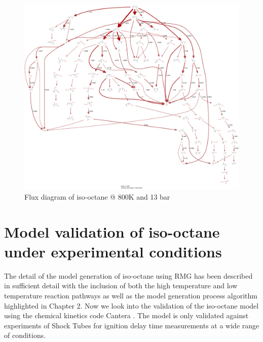 \begin{figure}[!htp]
    \centering
\hspace*{-3cm}
    \includegraphics[scale=0.2,keepaspectratio]{images/ic8-flux_pathways.png}
    \caption{Flux diagram of iso-octane @ 800K and 13 bar}
    \label{fig:f2}
\end{figure}

\cleardoublepage

\section{Model validation of iso-octane under experimental conditions}
The detail of the model generation of iso-octane using RMG has been described in sufficient detail with the inclusion of both the high temperature and low temperature reaction pathways as well as the model generation process algorithm highlighted in Chapter 2. Now we look into the validation of the iso-octane model using the chemical kinetics code Cantera \cite{cantera}. The model is only validated against experiments of Shock Tubes for ignition delay time measurements at a wide range of conditions.


